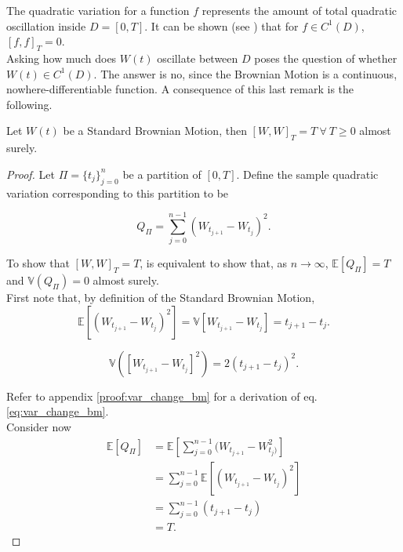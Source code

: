 \documentclass[../TGMAFFIRO]{subfiles}
\begin{document}
The quadratic variation for a function $f$ represents the amount of total quadratic oscillation inside $D = [0,T]$. It can be shown (see ) that for $f \in C^1(D)$, $[f,f]_T = 0$.\\
	
Asking how much does $W(t)$ oscillate between $D$ poses the question of whether $W(t) \in C^1(D)$. The answer is no, since the Brownian Motion is a continuous, nowhere-differentiable function. A consequence of this last remark is the following.

\begin{theorem}\label{th:quadratic_brownian_motion}
	Let $W(t)$ be a Standard Brownian Motion, then $[W, W]_T = T \ \forall \ T \geq 0$ almost surely.
\end{theorem}

\begin{proof}
	Let $\Pi = \{t_j\}_{j=0}^n$ be a partition of $[0, T]$. Define the sample quadratic variation corresponding to this partition to be
	
	\[
		Q_{\Pi} = \sum_{j=0}^{n-1}(W_{t_{j+1}} - W_{t_{j}})^2.
	\]
	
	To show that $[W, W]_T = T$, is equivalent to show that, as $n\to\infty$, $\mathbb{E}[Q_\Pi] = T$ and $\mathbb{V}(Q_\Pi) = 0$ almost surely.\\
	
	First note that, by definition of the Standard Brownian Motion,
	\begin{equation}\label{eq:exp_change_bm}
		\mathbb{E}[(W_{t_{j+1}} - W_{t_{j}})^2] = \mathbb{V}[W_{t_{j+1}} - W_{t_{j}}] = t_{j+1} - t_{j}.
	\end{equation}
	
	\begin{equation}\label{eq:var_change_bm}
		\mathbb{V}([W_{t_{j+1}} - W_{t_{j}}]^2) = 2(t_{j+1} - t_{j})^2.
	\end{equation}
	
	Refer to appendix \ref{proof:var_change_bm} for a derivation of eq. \ref{eq:var_change_bm}.\\
	
	Consider now
	\begin{align*}
		\mathbb{E}[Q_\Pi] &= \mathbb{E}[\sum_{j=0}^{n-1}(W_{t_{j+1}} - W_{t_{j})}^2] \\
		&= \sum_{j=0}^{n-1}\mathbb{E}[(W_{t_{j+1}} - W_{t_{j}})^2] \\
		&= \sum_{j=0}^{n-1}(t_{j+1} - t_{j}) \\
		&= T.
	\end{align*}
	

\end{proof}
\end{document}

